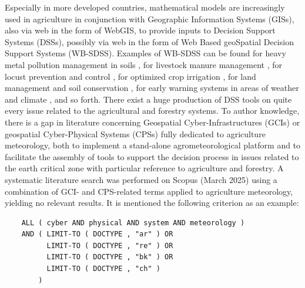 \documentclass[authoryear,preprint,review,12pt]{elsarticle}
\newcommand{\note}[1]{\emph{\textcolor{red}{#1}}}
\newcommand{\review}[1]{\emph{\textcolor{cyan}{#1}}}
\newcommand{\statusblock}[3]{
    \ifthenelse{\equal{#2}{todo}}
        {\textcolor{red}{#1 (TO DO): #3}}
        {}
    \ifthenelse{\equal{#2}{wip}}
        {\textcolor{magenta}{#1 (IN PROGRESS): #3}}
        {}
    \ifthenelse{\equal{#2}{update}}
        {\textcolor{blue}{#1 (UPDATE): #3}}
        {}
    \ifthenelse{\equal{#2}{review}}
        {\textcolor{cyan}{#1 (REVIEW): #3}}
        {}
    \ifthenelse{\equal{#2}{done}}
        {\textcolor{PineGreen}{#1 (READY): #3}}
        {}
}
\begin{document}
Especially in more developed countries, mathematical models are increasingly used in agriculture in conjunction with Geographic Information Systems (GISs), also via web in the form of WebGIS, to provide inputs to Decision Support Systems (DSSs), possibly via web in the form of Web Based geoSpatial Decision Support Systems (WB-SDSS).
Examples of WB-SDSS can be found 
for heavy metal pollution management in soils \citep{Wang:wbsdss:2017}, 
for livestock manure management \citep{Acutis:wbsdss:2014}, 
for locust prevention and control \citep{Yao:wbsdss:2017}, 
for optimized crop irrigation \citep{Giusti:wbsdss:2015}, 
for land management and soil conservation \citep{Terribile:LandSupport:2024}, 
for early warning systems in areas of weather and climate \citep{Bopape_2019},
and so forth.
There exist a huge production of DSS tools on quite every issue related to the agricultural and forestry systems.
To author knowledge, there is a gap in literature concerning Geospatial Cyber-Infrastructures (GCIs) or geospatial Cyber-Physical Systems (CPSs) fully dedicated to agriculture meteorology, both to implement a stand-alone agrometeorological platform and to facilitate the assembly of tools to support the decision process in issues related to the earth critical zone with particular reference to agriculture and forestry. 
A systematic literature search was performed on Scopus (March 2025) using a combination of GCI- and CPS-related terms applied to agriculture meteorology, yielding no relevant results. 
It is mentioned the following criterion as an example:
\begin{verbatim} 
    ALL ( cyber AND physical AND system AND meteorology ) 
    AND ( LIMIT-TO ( DOCTYPE , "ar" ) OR 
          LIMIT-TO ( DOCTYPE , "re" ) OR 
          LIMIT-TO ( DOCTYPE , "bk" ) OR 
          LIMIT-TO ( DOCTYPE , "ch" )
        ) 
\end{verbatim}
\end{document}
